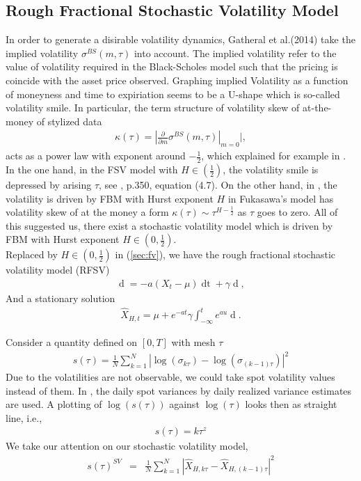\documentclass[a4paper, twoside, 11pt]{article}
\theoremstyle{definition}
\begin{document}
\subsection{Rough Fractional Stochastic Volatility Model}
In order to generate a disirable volatility dynamics, Gatheral et al.(2014) take the implied volatility $\sigma^{BS}(m, \tau)$ into account. The implied volatility refer to the value of volatility required in the Black-Scholes model such that the pricing is coincide with the asset price observed. Graphing implied Volatility as a function of moneyness and time to expiriation seems to be a U-shape which is so-called volatility smile. In particular, the term structure of volatility skew of at-the-money of stylized data
\begin{eqnarray*}
  \kappa(\tau)=|\frac{\partial}{\partial m}\sigma^{BS}(m, \tau)|_{m=0}|,
\end{eqnarray*}
acts as a power law with exponent around $-\frac{1}{2}$, which explained for example in \cite{gradin}. In the one hand, in the FSV model with $H \in (\frac{1}{2})$, the volatility smile is depressed by arising $\tau$, see \cite{comteetla}, p.350, equation (4.7). On the other hand,  in \cite{fukasawa}, the volatility is driven by FBM with Hurst exponent $H$ in Fukasawa's model has volatility skew of at the money a form $\kappa(\tau) \sim \tau^{H-\frac{1}{2}}$ as $\tau$ goes to zero.  All of this suggested us, there exist a stochastic volatility model which is driven by FBM with Hurst exponent $H \in (0, \frac{1}{2})$.\\
Replaced by $H \in (0, \frac{1}{2})$ in (\ref{sec:fv}), we have the rough fractional stochastic volatility model (RFSV)
\begin{eqnarray}
  \mathop{dX_t} = -a(X_t - \mu)\mathop{dt} + \gamma \mathop{dU_H(t)},
  \label{sec:rfm}
\end{eqnarray}
And a stationary solution
\begin{eqnarray}
\hat{X}_{H,t}=\mu + e^{-at}\gamma\int_{-\infty}^t e^{au}\mathop{dU_H(u)}.
\label{sec:rfm2}
\end{eqnarray}

Consider a quantity defined on $[0, T]$ with mesh $\tau$
\begin{eqnarray}
  s(\tau) = \frac{1}{N}\sum\limits_{k=1}^N|\log(\sigma_{k\tau}) - \log(\sigma_{(k-1)\tau})|^2
  \label{sec:smo}
\end{eqnarray}
Due to the volatilities are not observable, we could take spot volatility values instead of them. In \cite{chridito}, the daily spot variances by daily realized variance estimates are used. A plotting of $\log(s(\tau))$ against $\log(\tau)$ looks then as straight line, i.e.,
\begin{eqnarray}
  s(\tau) =  k\tau^z
  \label{sec:smth}
\end{eqnarray}
We take our attention on our stochastic volatility model, 
\begin{eqnarray}
  s(\tau)^{SV} &=&  \frac {1}{N}\sum\limits_{k=1}^N|\hat{X}_{H,k\tau} - \hat{X}_{H,(k-1)\tau}|^2\nonumber
\end{eqnarray}
\end{document}
